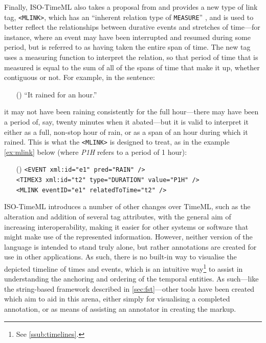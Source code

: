 \documentclass[a4paper,12pt,leqno,twoside]{article}
\newcommand{\ipp}{(\refstepcounter{equation}\theequation)}
\begin{document}
\label{other:iso-mlink}Finally, ISO-TimeML also takes a proposal from \citep{bunt2010annotating} and provides a new type of link tag, \verb|<MLINK>|, which has an ``inherent relation type of \verb|MEASURE|'' \citep[p. 396]{pustejovsky2010iso}, and is used to better reflect the relationships between durative events and stretches of time---for instance, where an event may have been interrupted and resumed during some period, but is referred to as having taken the entire span of time. The new tag uses a measuring function \citep{bunt1985mass} to interpret the relation, so that period of time that is measured is equal to the sum of all of the spans of time that make it up, whether contiguous or not. For example, in the sentence:
\begin{itemize}
	\item[\ipp] ``It rained for an hour.''
\end{itemize}
it may not have been raining consistently for the full hour---there may have been a period of, say, twenty minutes when it abated---but it is valid to interpret it either as a full, non-stop hour of rain, or as a span of an hour during which it rained. This is what the \verb|<MLINK>| is designed to treat, as in the example \cref{ex:mlink} below (where \textit{P1H} refers to a period of 1 hour):
\begin{itemize}
	\item[\ipp\label{ex:mlink}] \verb|<EVENT xml:id="e1" pred="RAIN" />|\\\verb|<TIMEX3 xml:id="t2" type="DURATION" value="P1H" />|\\\verb|<MLINK eventID="e1" relatedToTime="t2" />|
\end{itemize}
ISO-TimeML introduces a number of other changes over TimeML, such as the alteration and addition of several tag attributes, with the general aim of increasing interoperability, making it easier for other systems or software that might make use of the represented information. However, neither version of the language is intended to stand truly alone, but rather annotations are created for use in other applications. As such, there is no built-in way to visualise the depicted timeline of times and events, which is an intuitive way\footnote{See \cref{ssub:timelines}.} to assist in understanding the anchoring and ordering of the temporal entities. As such---like the string-based framework described in \cref{sec:fst}---other tools have been created which aim to aid in this arena, either simply for visualising a completed annotation, or as means of assisting an annotator in creating the markup.
\end{document}
